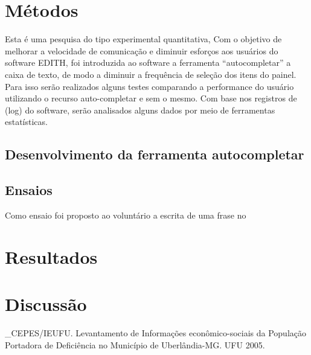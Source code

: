 \documentclass[twoside]{article}
\begin{document}
\begin{multicols}{2}

\section{Métodos}

Esta é uma pesquisa do tipo experimental quantitativa, Com o objetivo de melhorar a velocidade de comunicação e diminuir esforços aos usuários do software EDITH, foi introduzida ao software a ferramenta “autocompletar” a caixa de texto, de modo a diminuir a frequência de seleção dos itens do painel. Para isso serão realizados alguns testes comparando a performance do usuário utilizando o recurso auto-completar e sem o mesmo. Com base nos registros de (log) do software, serão analisados alguns dados por meio de ferramentas estatísticas.

\subsection{Desenvolvimento da ferramenta autocompletar}

\subsection{Ensaios}
Como ensaio foi proposto ao voluntário a escrita de uma frase no 



\section{Resultados}


\section{Discussão}



\begin{thebibliography}{99} %

\bibitem _CEPES/IEUFU. Levantamento de Informações econômico-sociais da População Portadora de Deficiência no Município de Uberlândia-MG. UFU 2005.


\end{thebibliography}
\end{multicols}
\end{document}
